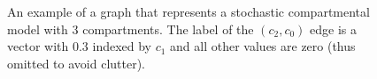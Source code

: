 \documentclass{article}
\begin{document}
\begin{figure}[h]
    \centering
    \caption{An example of a graph that represents a stochastic compartmental model with 3 compartments. The label of the $(c_2, c_0)$ edge is a vector with $0.3$ indexed by $c_1$ and all other values are zero (thus omitted to avoid clutter).}
    \label{fig:stochastic_compartmental_model}
\end{figure}
\end{document}
